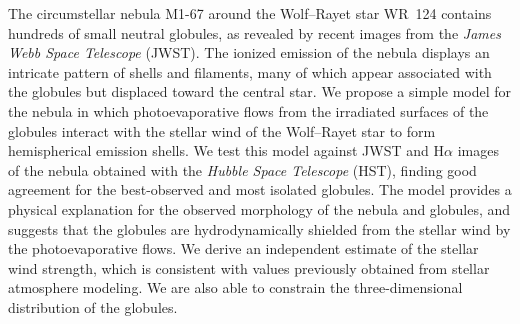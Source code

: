 \documentclass{book}
\begin{document}
The circumstellar nebula M1-67 around the Wolf–Rayet star WR~124
contains hundreds of small neutral globules, as revealed by recent
images from the \textit{James Webb Space Telescope} (JWST). The
ionized emission of the nebula displays an intricate pattern of shells
and filaments, many of which appear associated with the globules but
displaced toward the central star. We propose a simple model for the
nebula in which photoevaporative flows from the irradiated surfaces of
the globules interact with the stellar wind of the Wolf–Rayet star to
form hemispherical emission shells. We test this model against JWST
and H$\alpha$ images of the nebula obtained with the \textit{Hubble Space
  Telescope} (HST), finding good agreement for the best-observed and
most isolated globules. The model provides a physical explanation for
the observed morphology of the nebula and globules, and suggests that
the globules are hydrodynamically shielded from the stellar wind by
the photoevaporative flows. We derive an independent estimate of the
stellar wind strength, which is consistent with values previously
obtained from stellar atmosphere modeling. We are also able to
constrain the three-dimensional distribution of the globules.



\end{document}
